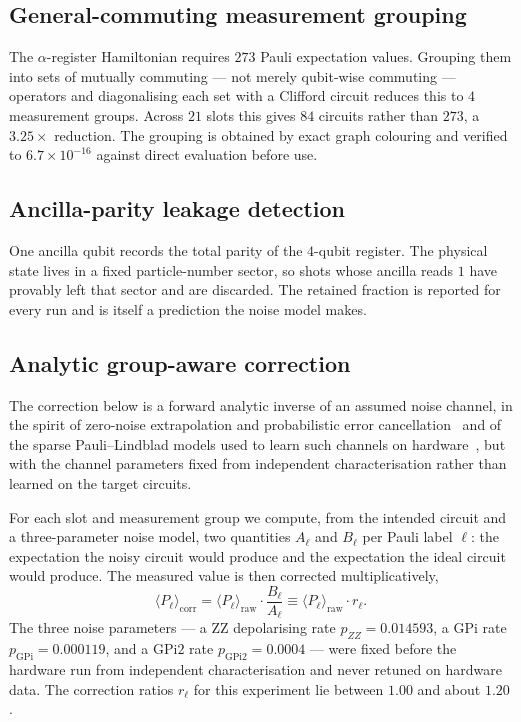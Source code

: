 \documentclass[aps,prx,twocolumn,superscriptaddress,nofootinbib,floatfix]{revtex4-2}
\begin{document}
\subsection{General-commuting measurement grouping}

The $\alpha$-register Hamiltonian requires $273$ Pauli expectation values.
Grouping them into sets of mutually commuting --- not merely
qubit-wise commuting --- operators and diagonalising each set with a
Clifford circuit reduces this to $4$ measurement groups. Across $21$ slots
this gives $84$ circuits rather than $273$, a $3.25\times$ reduction. The
grouping is obtained by exact graph colouring and verified to
$6.7\times10^{-16}$ against direct evaluation before use.

\subsection{Ancilla-parity leakage detection}

One ancilla qubit records the total parity of the $4$-qubit register. The
physical state lives in a fixed particle-number sector, so shots whose
ancilla reads $1$ have provably left that sector and are discarded. The
retained fraction is reported for every run and is itself a prediction the
noise model makes.

\subsection{Analytic group-aware correction}

The correction below is a forward analytic inverse of an assumed noise
channel, in the spirit of zero-noise extrapolation and probabilistic error
cancellation~\cite{temme2017} and of the sparse Pauli--Lindblad models used
to learn such channels on hardware~\cite{vandenberg2023}, but with the
channel parameters fixed from independent characterisation rather than
learned on the target circuits.

For each slot and measurement group we compute, from the intended circuit
and a three-parameter noise model, two quantities $A_\ell$ and $B_\ell$
per Pauli label $\ell$: the expectation the noisy circuit would produce
and the expectation the ideal circuit would produce. The measured value is
then corrected multiplicatively,
\begin{equation}
\langle P_\ell \rangle_{\mathrm{corr}}
= \langle P_\ell \rangle_{\mathrm{raw}} \cdot \frac{B_\ell}{A_\ell}
\equiv \langle P_\ell \rangle_{\mathrm{raw}} \cdot r_\ell .
\label{eq:corr}
\end{equation}
The three noise parameters --- a $\mathrm{ZZ}$ depolarising rate
$p_{ZZ}=0.014593$, a $\mathrm{GPi}$ rate $p_{\mathrm{GPi}}=0.000119$, and a
$\mathrm{GPi2}$ rate $p_{\mathrm{GPi2}}=0.0004$ --- were fixed before the
hardware run from independent characterisation and never retuned on
hardware data. The correction ratios $r_\ell$ for this experiment lie
between $1.00$ and about $1.20$.
\end{document}
